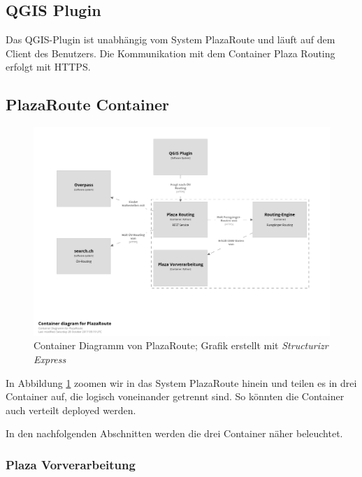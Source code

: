 \subsection{QGIS Plugin}
\label{architektur:QGIS Plugin}
Das QGIS-Plugin ist unabhängig vom System PlazaRoute und läuft auf dem Client des Benutzers. Die Kommunikation mit dem Container Plaza Routing erfolgt mit HTTPS.

\subsection{PlazaRoute Container}
\label{architektur:PlazaRoute Container}

\begin{figure}[ht]
    \centering
    \includegraphics[width=1\linewidth]{projectdoc/img/container_diagram.png}
    \caption[Container Diagramm]{Container Diagramm von PlazaRoute; Grafik erstellt mit \emph{Structurizr Express}\cite{structurizr}}
    \label{fig:container_diagram}
    \end{figure}    

In Abbildung \ref{fig:container_diagram} zoomen wir in das System PlazaRoute hinein und teilen es in drei Container auf, die logisch voneinander getrennt sind. So könnten die Container auch verteilt deployed werden.

In den nachfolgenden Abschnitten werden die drei Container näher beleuchtet.


\subsubsection{Plaza Vorverarbeitung}
\label{architektur:Plaza Vorverarbeitung}

